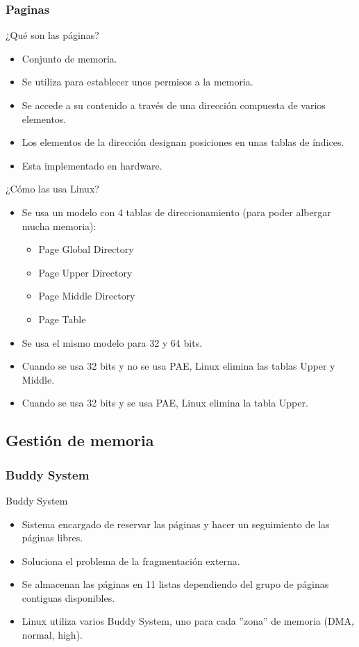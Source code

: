 \subsubsection{Paginas}
\begin{frame}{¿Qué son las páginas?}
	\begin{itemize}
		\item Conjunto de memoria.
		\item Se utiliza para establecer unos permisos a la memoria.
		\item Se accede a su contenido a través de una dirección compuesta de varios elementos.
		\item Los elementos de la dirección designan posiciones en unas tablas de índices.
		\item Esta implementado en hardware.
	\end{itemize}
\end{frame}

\begin{frame}{¿Cómo las usa Linux?}
	\begin{itemize}
		\item Se usa un modelo con 4 tablas de direccionamiento (para poder albergar mucha memoria):
		\begin{itemize}
			\item Page Global Directory
			\item Page Upper Directory
			\item Page Middle Directory
			\item Page Table
		\end{itemize}
		\item Se usa el mismo modelo para 32 y 64 bits.
		\item Cuando se usa 32 bits y no se usa PAE, Linux elimina las tablas Upper y Middle.
		\item Cuando se usa 32 bits y se usa PAE, Linux elimina la tabla Upper.
	\end{itemize}
\end{frame}

\subsection{Gestión de memoria}
\subsubsection{Buddy System}
\begin{frame}{Buddy System}
	\begin{itemize}
		\item Sistema encargado de reservar las páginas y hacer un seguimiento de las páginas libres.
		\item Soluciona el problema de la fragmentación externa.
		\item Se almacenan las páginas en 11 listas dependiendo del grupo de páginas contiguas disponibles.
		\item Linux utiliza varios Buddy System, uno para cada ''zona'' de memoria (DMA, normal, high).
	\end{itemize}
\end{frame}
